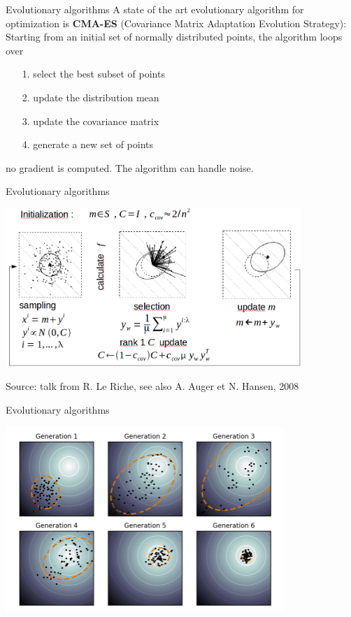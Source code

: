 \documentclass{beamer}
\begin{document}
\begin{frame}{Evolutionary algorithms}
A state of the art evolutionary algorithm for optimization is \textbf{CMA-ES} (Covariance Matrix Adaptation Evolution Strategy): \\
\vspace{3mm}
Starting from an initial set of normally distributed points, the algorithm loops over
\begin{itemize}
	\item[1.] select the best subset of points
	\item[2.] update the distribution mean
	\item[3.] update the covariance matrix
	\item[4.] generate a new set of points
\end{itemize}
\vspace{5mm}
 no gradient is computed. The algorithm can handle noise.\\
\end{frame}

\begin{frame}{Evolutionary algorithms}
\begin{center}
\includegraphics[height=6cm]{figures/RLRcmaes}
\end{center}
\small Source: talk from R. Le Riche, see also A. Auger et N. Hansen, 2008 
\end{frame}

\begin{frame}{Evolutionary algorithms}
\begin{example}
\begin{center}
\includegraphics[height=7cm]{figures/CMAES}
\end{center}	
\end{example}
\end{frame}
\end{document}
